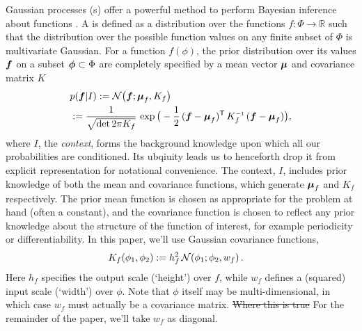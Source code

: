 \documentclass{article}
\begin{document}
Gaussian processes (\gp s) offer a powerful method to perform Bayesian
inference about functions \citep{GPsBook}. A \gpb is defined as a
distribution over the functions $f: \Phi \rightarrow \mathbb{R}$ such
that the distribution over the possible function values on any finite
subset of $\Phi$ is multivariate Gaussian.  For a function $f(\phi)$,
the prior distribution over its values $\vf$ on a subset
$\vph \subset \Phi$ are completely specified by a mean vector
$\vmu$ and covariance matrix $K$
\begin{align*}%
\textstyle
 &\p{\vf}{I} \deq \N{\vf}{\vmu_{f}}{K_{f}}\\
 &\deq\frac{1}{\sqrt{\det{2\pi K_{f}}}}\,\exp \big(-\frac{1}{2}\,(\vf-\vmu_{f})\tra\,K_{f}\inv\,(\vf-\vmu_{f})\big),
\end{align*}
where $I$, the \emph{context}, forms the background knowledge upon which all our probabilities are conditioned. Its ubqiuity leads us to henceforth drop it from explicit representation for notational convenience. The context, $I$, includes prior knowledge of both the
mean and covariance functions, which generate $\vmu_{f}$ and
$K_{f}$ respectively. The prior mean function is chosen as
appropriate for the problem at hand (often a constant), and the
covariance function is chosen to reflect any prior knowledge about the
structure of the function of interest, for example periodicity or
differentiability. In this paper, we'll use Gaussian
covariance functions,
\begin{align} \label{eq:Gaussian_cov_fn}
\textstyle
K_{f}(\phi_1,\phi_2)& \deq h_f^2\,\N{\phi_1}{\phi_2}{w_{f}}.
\end{align} 
Here $h_f$ specifies the output scale (`height') over $f$, while $w_f$ defines a (squared) input scale (`width') over $\phi$. Note that $\phi$ itself may be multi-dimensional, in which case $w_f$ must actually be a covariance matrix. \sout{Where this is true} For the remainder of the paper, we'll take $w_f$ as diagonal. 
\end{document}
